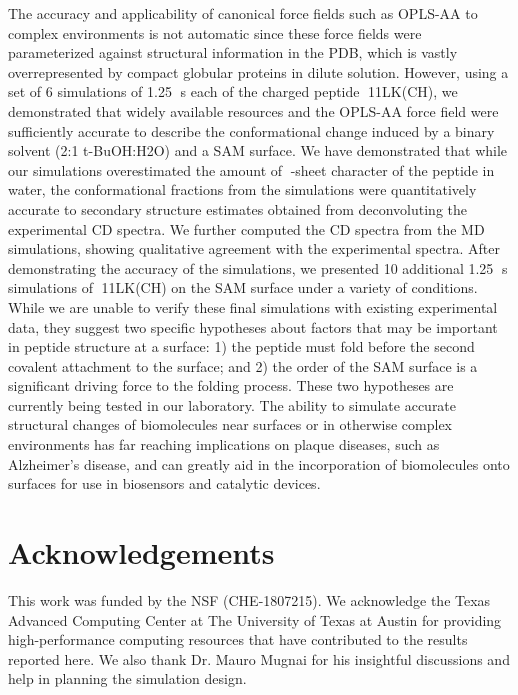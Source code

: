 The accuracy and applicability of canonical force fields such as OPLS-AA to complex environments is not automatic since these force fields were parameterized against structural information in the PDB, which is vastly overrepresented by compact globular proteins in dilute solution. However, using a set of 6 simulations of 1.25 s each of the charged peptide 11LK(CH), we demonstrated that widely available resources and the OPLS-AA force field were sufficiently accurate to describe the conformational change induced by a binary solvent (2:1 t-BuOH:H2O) and a SAM surface. We have demonstrated that while our simulations overestimated the amount of -sheet character of the peptide in water, the conformational fractions from the simulations were quantitatively accurate to secondary structure estimates obtained from deconvoluting the experimental CD spectra. We further computed the CD spectra from the MD simulations, showing qualitative agreement with the experimental spectra. After demonstrating the accuracy of the simulations, we presented 10 additional 1.25 s simulations of 11LK(CH) on the SAM surface under a variety of conditions. While we are unable to verify these final simulations with existing experimental data, they suggest two specific hypotheses about factors that may be important in peptide structure at a surface: 1) the peptide must fold before the second covalent attachment to the surface; and 2) the order of the SAM surface is a significant driving force to the folding process. These two hypotheses are currently being tested in our laboratory. The ability to simulate accurate structural changes of biomolecules near surfaces or in otherwise complex environments has far reaching implications on plaque diseases, such as Alzheimer’s disease, and can greatly aid in the incorporation of biomolecules onto surfaces for use in biosensors and catalytic devices.

\section{Acknowledgements}
%

This work was funded by the NSF (CHE-1807215). We acknowledge the Texas Advanced Computing Center at The University of Texas at Austin for providing high-performance computing resources that have contributed to the results reported here. We also thank Dr. Mauro Mugnai for his insightful discussions and help in planning the simulation design.
